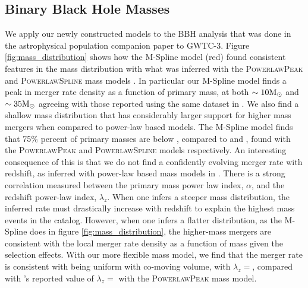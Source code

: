 \subsection{Binary Black Hole Masses} \label{sec:mass_dist}

We apply our newly constructed models to the BBH analysis that was done in the astrophysical population companion paper to GWTC-3. 
Figure \ref{fig:mass_distribution} shows how the M-Spline model (red) found consistent features in the mass distribution with 
what was inferred with the \textsc{PowerlawPeak} and \textsc{PowerlawSpline} mass models \citep{Talbot_2018,o3a_pop,Edelman_2022ApJ,o3b_astro_dist}. 
In particular our M-Spline model finds a peak in merger rate density as a function of primary mass, at both $\sim10{\rm M}_\odot$ and $\sim35{\rm M}_\odot$ agreeing with those 
reported using the same dataset in \citet{o3b_astro_dist}. We also find a shallow mass distribution that has considerably larger support for higher mass mergers when 
compared to power-law based models. The M-Spline model finds that 75\% percent of primary masses are below \result{$\CIPlusMinus{\macros[MassDistribution][MSpline][m_75percentile]}$}, 
compared to \result{$\CIPlusMinus{\macros[MassDistribution][PLPeak][m_75percentile]}$} and \result{$\CIPlusMinus{\macros[MassDistribution][PLSpline][m_75percentile]}$}, found with 
the \textsc{PowerlawPeak} and \textsc{PowerlawSpline} models respectively. An interesting consequence of this is that we do not find a confidently evolving merger rate with redshift, 
as inferred with power-law based mass models in \citet{o3b_astro_dist}. There is a strong correlation measured between the primary mass power law index, 
$\alpha$, and the redshift power-law index, $\lambda_z$. When one infers a steeper mass distribution, 
the inferred rate must drastically increase with redshift to explain the highest mass events in the catalog. However, when one infers a 
flatter distribution, as the M-Spline does in figure \ref{fig:mass_distribution}, the higher-mass mergers are consistent with 
the local merger rate density as a function of mass given the selection effects. With our more flexible mass model, we find that the merger rate 
is consistent with being uniform with co-moving volume, with $\lambda_z = $\result{$\CIPlusMinus{\macros[MSplineIIDCompSpins][lamb]}$}, compared with 
\citet{o3b_astro_dist}'s reported value of $\lambda_z = $\result{$\CIPlusMinus{\macros[PLPeak][lamb]}$} with the \textsc{PowerlawPeak} mass model.

